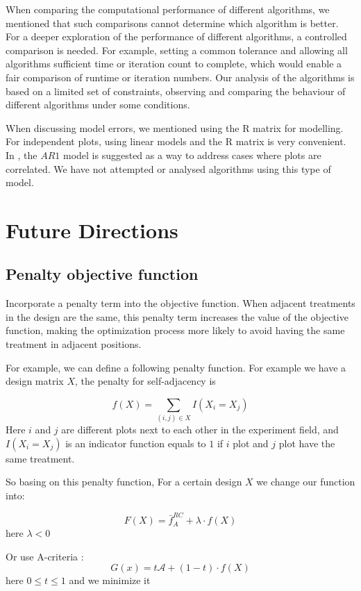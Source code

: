 \documentclass[
  a4paper,
  oneside,
  openany,
  12pt,
  onecolumn]{book}
\theoremstyle{definition}
\theoremstyle{definition}
\theoremstyle{plain}
\theoremstyle{remark}
\begin{document}
When comparing the computational performance of different algorithms, we
mentioned that such comparisons cannot determine which algorithm is
better. For a deeper exploration of the performance of different
algorithms, a controlled comparison is needed. For example, setting a
common tolerance and allowing all algorithms sufficient time or
iteration count to complete, which would enable a fair comparison of
runtime or iteration numbers. Our analysis of the algorithms is based on
a limited set of constraints, observing and comparing the behaviour of
different algorithms under some conditions.

When discussing model errors, we mentioned using the R matrix for
modelling. For independent plots, using linear models and the R matrix
is very convenient. In \citet{piepho2018neighbor}, the \({AR1}\) model
is suggested as a way to address cases where plots are correlated. We
have not attempted or analysed algorithms using this type of model.

\section{Future Directions}\label{future-directions}

\subsection{Penalty objective
function}\label{penalty-objective-function}

Incorporate a penalty term into the objective function. When adjacent
treatments in the design are the same, this penalty term increases the
value of the objective function, making the optimization process more
likely to avoid having the same treatment in adjacent positions.

For example, we can define a following penalty function. For example we
have a design matrix \(X\), the penalty for self-adjacency is

\[
f(X) = \sum_{(i,j)\in X}I(X_i = X_j)
\] Here \(i\) and \(j\) are different plots next to each other in the
experiment field, and \(I(X_i = X_j)\) is an indicator function equals
to \(1\) if \(i\) plot and \(j\) plot have the same treatment.

So basing on this penalty function, For a certain design \(X\) we change
our function into:

\[
F(X) = \bar{f}_A^{RC} + \lambda \cdot f(X)
\] here \(\lambda < 0\)

Or use A-criteria : \[
G(x) = t\mathcal{A} + (1-t)\cdot f(X)
\] here \(0\leq t \leq 1\) and we minimize it
\end{document}

